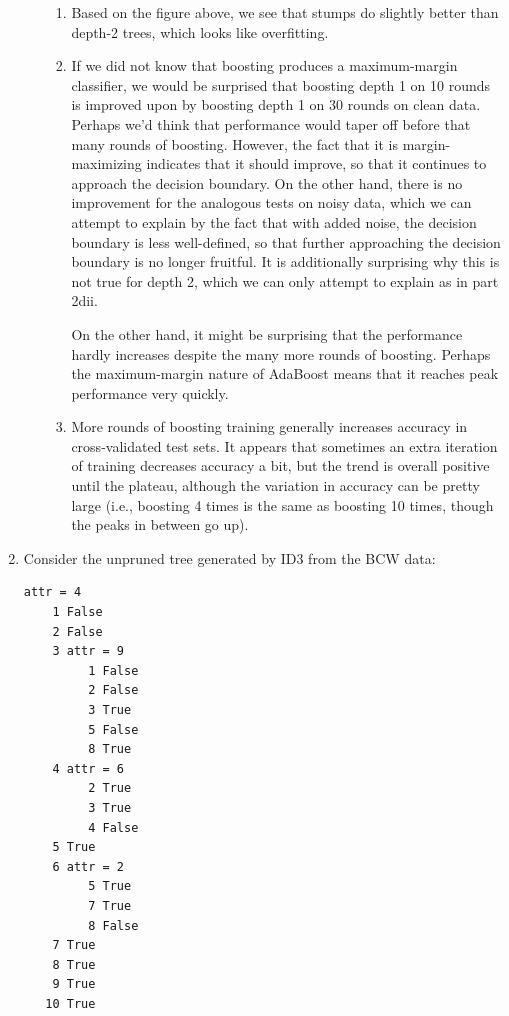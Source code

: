 \documentclass{article}
\begin{document}
\begin{enumerate}
\begin{enumerate}
\begin{enumerate}
 
    \item Based on the figure above, we see that stumps do slightly
      better than depth-2 trees, which looks like overfitting.
    \item If we did not know that boosting produces a maximum-margin
      classifier, we would be surprised that boosting depth 1 on 10
      rounds is improved upon by boosting depth 1 on 30 rounds on
      clean data. Perhaps we'd think that performance would taper off
      before that many rounds of boosting. However, the fact that it
      is margin-maximizing indicates that it should improve, so that
      it continues to approach the decision boundary. On the other
      hand, there is no improvement for the analogous tests on noisy
      data, which we can attempt to explain by the fact that with
      added noise, the decision boundary is less well-defined, so that
      further approaching the decision boundary is no longer fruitful.
      It is additionally surprising why this is not true for depth 2,
      which we can only attempt to explain as in part 2dii.

      On the other hand, it might be surprising that the performance
      hardly increases despite the many more rounds of
      boosting. Perhaps the maximum-margin nature of AdaBoost means
      that it reaches peak performance very quickly.
    \item More rounds of boosting training generally increases
      accuracy in cross-validated test sets. It appears that sometimes
      an extra iteration of training decreases accuracy a bit, but the
      trend is overall positive until the plateau, although the
      variation in accuracy can be pretty large (i.e., boosting 4
      times is the same as boosting 10 times, though the peaks in
      between go up).
    \end{enumerate}
  \end{enumerate}
\item Consider the unpruned tree generated by ID3 from the BCW data:
  {\small
\begin{verbatim}
attr = 4
    1 False
    2 False
    3 attr = 9
         1 False
         2 False
         3 True
         5 False
         8 True
    4 attr = 6
         2 True
         3 True
         4 False
    5 True
    6 attr = 2
         5 True
         7 True
         8 False
    7 True
    8 True
    9 True
   10 True
\end{verbatim}
}


\end{enumerate}
\end{document}
